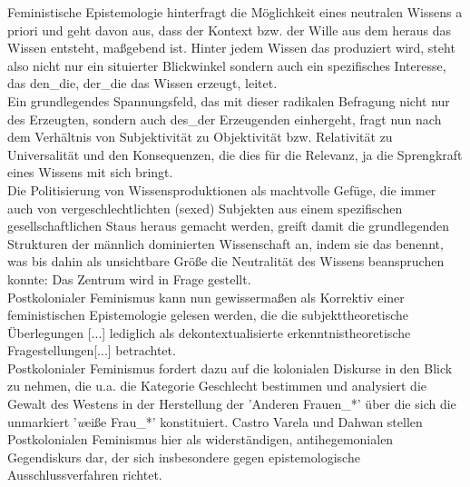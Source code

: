 \noindent Feministische Epistemologie hinterfragt die Möglichkeit eines neutralen Wissens
a priori und geht davon aus, dass der Kontext bzw. der Wille aus dem heraus das
Wissen entsteht, maßgebend ist. Hinter jedem Wissen das produziert wird, steht
also nicht nur ein situierter Blickwinkel sondern auch ein spezifisches
Interesse, das den\_die, der\_die das Wissen erzeugt, leitet.\\
 Ein grundlegendes
Spannungsfeld, das mit dieser radikalen Befragung nicht nur des Erzeugten,
sondern auch des\_der Erzeugenden einhergeht, fragt nun nach dem Verhältnis von
Subjektivität zu Objektivität bzw. Relativität zu Universalität und den
Konsequenzen, die dies für die Relevanz, ja die Sprengkraft eines Wissens mit
sich bringt.\footnotemark {} \\
Die Politisierung von Wissensproduktionen als machtvolle Gefüge,
die immer auch von vergeschlechtlichten (sexed) Subjekten aus einem
spezifischen gesellschaftlichen Staus heraus gemacht werden, greift damit die
grundlegenden Strukturen der männlich dominierten Wissenschaft an, indem sie
das benennt, was bis dahin als unsichtbare Größe die Neutralität des Wissens
beanspruchen konnte: Das Zentrum wird in Frage gestellt.\footnotemark
{}\\

\noindent Postkolonialer Feminismus kann nun gewissermaßen als Korrektiv einer
feministischen Epistemologie gelesen werden, die die \glqq subjekttheoretische
Überlegungen [...] lediglich als dekontextualisierte erkenntnistheoretische
Fragestellungen[...]\grqq \footnotemark {} betrachtet. \\
Postkolonialer Feminismus fordert dazu auf die kolonialen
Diskurse in den Blick zu nehmen, die u.a. die Kategorie Geschlecht bestimmen
und \glqq analysiert die Gewalt des Westens\grqq \footnotemark
{} in der Herstellung der 'Anderen
Frauen\_*' über die sich die unmarkiert '\textit{w}eiße Frau\_*' konstituiert.
Castro Varela und Dahwan stellen Postkolonialen Feminismus hier als
\glqq widerständigen, antihegemonialen Gegendiskurs dar, der sich insbesondere gegen
epistemologische Ausschlussverfahren richtet.\grqq \footnotemark
{}\\


